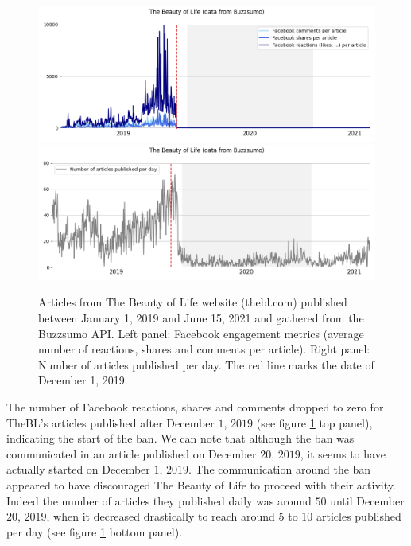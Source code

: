 \documentclass{article}
\begin{document}
\begin{figure}[h]
	\centering
	
		\includegraphics[scale=0.3]{../figure/facebook_buzzsumo_thebl_1.png}
		\includegraphics[scale=0.3]{../figure/facebook_buzzsumo_thebl_2.png} 
	
	\caption{Articles from The Beauty of Life website (thebl.com) published between January 1, 2019 and June 15, 2021 and gathered from the Buzzsumo API. Left panel: Facebook engagement metrics (average number of reactions, shares and comments per article). Right panel: Number of articles published per day. The red line marks the date of December 1, 2019. }
	\label{fb_bl}
\end{figure}

The number of Facebook reactions, shares and comments dropped to zero for TheBL’s articles published after December $1$, $2019$ (see figure \ref{fb_bl} top panel), indicating the start of the ban. We can note that although the ban was communicated in an article published on December $20$, $2019$, it seems to have actually started on December $1$, $2019$. The communication around the ban appeared to have discouraged The Beauty of Life to proceed with their activity. Indeed the number of articles they published daily was around $50$ until December $20$, $2019$, when it decreased drastically to reach around $5$ to $10$ articles published per day (see figure \ref{fb_bl} bottom panel). 
\end{document}
